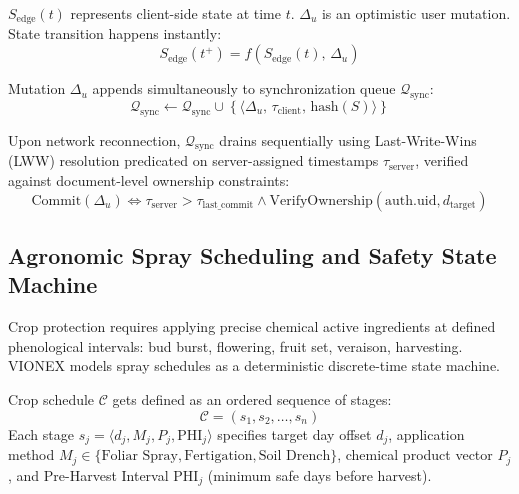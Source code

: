 \documentclass[conference]{IEEEtran}
\begin{document}
$S_{\text{edge}}(t)$ represents client-side state at time $t$. $\Delta_u$ is an optimistic user mutation. State transition happens instantly:
\begin{equation}
S_{\text{edge}}(t^+) = f\left(S_{\text{edge}}(t),\, \Delta_u\right)
\end{equation}

Mutation $\Delta_u$ appends simultaneously to synchronization queue $\mathcal{Q}_{\text{sync}}$:
\begin{equation}
\mathcal{Q}_{\text{sync}} \leftarrow \mathcal{Q}_{\text{sync}} \cup \left\{ \langle \Delta_u,\, \tau_{\text{client}},\, \text{hash}(S) \rangle \right\}
\end{equation}

Upon network reconnection, $\mathcal{Q}_{\text{sync}}$ drains sequentially using Last-Write-Wins (LWW) resolution predicated on server-assigned timestamps $\tau_{\text{server}}$, verified against document-level ownership constraints:
\begin{equation}
\text{Commit}(\Delta_u) \iff \tau_{\text{server}} > \tau_{\text{last\_commit}} \land \text{VerifyOwnership}(\text{auth.uid}, d_{\text{target}})
\end{equation}

\subsection{Agronomic Spray Scheduling and Safety State Machine}
Crop protection requires applying precise chemical active ingredients at defined phenological intervals: bud burst, flowering, fruit set, veraison, harvesting. VIONEX models spray schedules as a deterministic discrete-time state machine.

Crop schedule $\mathcal{C}$ gets defined as an ordered sequence of stages:
\begin{equation}
\mathcal{C} = \left( s_1, s_2, \dots, s_n \right)
\end{equation}
Each stage $s_j = \langle d_j, M_j, P_j, \text{PHI}_j \rangle$ specifies target day offset $d_j$, application method $M_j \in \{\text{Foliar Spray}, \text{Fertigation}, \text{Soil Drench}\}$, chemical product vector $P_j$, and Pre-Harvest Interval $\text{PHI}_j$ (minimum safe days before harvest).
\end{document}
